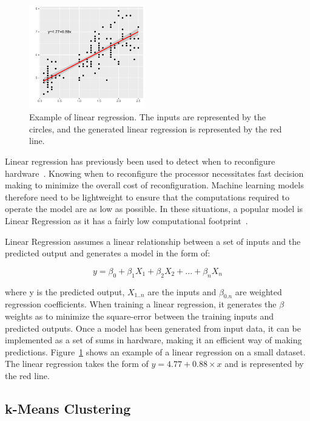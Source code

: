 \begin{figure}[t]
    \centering
    \includegraphics[width=0.45\textwidth]{background/graphics/lin_reg_ex.pdf}
	\vspace{-1em}
    \caption{Example of linear regression. The inputs are represented by the circles, and the generated linear regression is represented by the red line.}
    \label{fig:linregex}
\end{figure}
Linear regression has previously been used to detect when to reconfigure hardware~\cite{tavanaElastic}.
Knowing when to reconfigure the processor necessitates fast decision making to minimize the overall cost of reconfiguration.
Machine learning models therefore need to be lightweight to ensure that the computations required to operate the model are as low as possible.
In these situations, a popular model is Linear Regression as it has a fairly low computational footprint~\cite{tavanaElastic}.

Linear Regression assumes a linear relationship between a set of inputs and the predicted output and generates a model in the form of:

\begin{equation}
y = \beta_0 + \beta_1X_1 + \beta_2X_2 + ... + \beta_nX_n
\end{equation}

where y is the predicted output, $X_{1..n}$ are the inputs and $\beta_{0.n}$ are weighted regression coefficients.
When training a linear regression, it generates the $\beta$ weights as to minimize the square-error between the training inputs and predicted outputs.
Once a model has been generated from input data, it can be implemented as a set of sums in hardware, making it an efficient way of making predictions.
Figure~\ref{fig:linregex} shows an example of a linear regression on a small dataset.
The linear regression takes the form of $y=4.77 + 0.88 \times x$ and is represented by the red line.

\subsection{k-Means Clustering}~\label{sec:kMeans}

